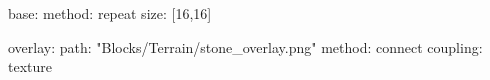 base:
  method: repeat
  size: [16,16]

overlay:
  path: "Blocks/Terrain/stone_overlay.png"
  method: connect
  coupling: texture